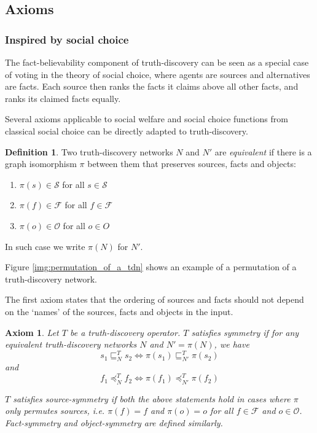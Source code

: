 \documentclass{article}
\theoremstyle{definition} \newtheorem{definition}{Definition}
\theoremstyle{definition} \newtheorem{example}{Example}
\theoremstyle{plain} \newtheorem{axiom}{Axiom}
\theoremstyle{plain} \newtheorem*{remark}{Remark}
\theoremstyle{remark} \newtheorem*{notation}{Notation}
\theoremstyle{plain} \newtheorem{lemma}{Lemma}
\theoremstyle{plain} \newtheorem{proposition}{Proposition}
\renewcommand{\S}{\mathcal{S}}  %
\renewcommand{\O}{\mathcal{O}}  %
\newcommand{\F}{\mathcal{F}}
\newcommand{\sle}{\sqsubseteq}
\newcommand{\fle}{\preceq}
\begin{document}
\subsection{Axioms}

\subsubsection{Inspired by social choice}

The fact-believability component of truth-discovery can be seen as a special
case of voting in the theory of social choice, where agents are sources and
alternatives are facts. Each source then ranks the facts it claims above all
other facts, and ranks its claimed facts equally.\footnotemark


Several axioms applicable to social welfare and social choice functions from
classical social choice can be directly adapted to truth-discovery.

\begin{definition}
Two truth-discovery networks $N$ and $N'$ are \emph{equivalent} if there is a
graph isomorphism $\pi$ between them that preserves sources, facts and objects:
\begin{enumerate}
\item $\pi(s) \in \S$ for all $s \in \S$
\item $\pi(f) \in \F$ for all $f \in \F$
\item $\pi(o) \in \O$ for all $o \in O$
\end{enumerate}

In such case we write $\pi(N)$ for $N'$.
\end{definition}

Figure \ref{img:permutation_of_a_tdn} shows an example of a permutation of a
truth-discovery network.

The first axiom states that the ordering of sources and facts should not depend
on the `names' of the sources, facts and objects in the input.

\begin{axiom}
\label{axiom:symmetry}
Let $T$ be a truth-discovery operator. $T$ satisfies \emph{symmetry} if for
any equivalent truth-discovery networks $N$ and $N' = \pi(N)$, we have
$$ s_1 \sle_N^T s_2 \iff \pi(s_1) \sle_{N'}^T \pi(s_2) $$
and
$$ f_1 \fle_N^T f_2 \iff \pi(f_1) \fle_{N'}^T \pi(f_2) $$

$T$ satisfies \emph{source-symmetry} if both the above statements hold in cases
where $\pi$ only permutes sources, i.e. $\pi(f)=f$ and $\pi(o)=o$ for all $f
\in \F$ and $o \in \O$. \emph{Fact-symmetry} and \emph{object-symmetry} are
defined similarly.
\end{axiom}
\end{document}
